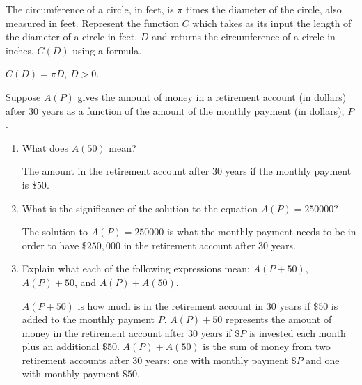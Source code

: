 \documentclass{ximera}
\begin{document}
\begin{problem}
The circumference of a circle, in feet,  is $\pi$ times the diameter of the circle, also measured in feet.  Represent the function $C$ which takes as its input the length of the diameter of a circle in feet, $D$ and returns the circumference of a circle in inches, $C(D)$ using a formula.

\begin{solution}
$C(D) = \pi D$,  $D > 0$.
\end{solution}
\end{problem}

\begin{problem}
Suppose $A(P)$ gives the amount of money in a retirement account (in dollars) after 30 years as a function of the amount of the monthly payment (in dollars), $P$.

\begin{enumerate}

\item What does $A(50)$ mean? 

\begin{solution}
The amount in the retirement account after 30 years if the monthly payment is $\$50$.
\end{solution}

\item  What is the significance of the solution to the equation $A(P) = 250000$? 

\begin{solution}
The solution to $A(P) = 250000$ is what the monthly payment needs to be in order to have $\$250,\!000$ in the retirement account after 30 years.
\end{solution}

\item  Explain what each of the following expressions mean:  $A(P+50)$, $A(P)+50$, and $A(P) + A(50)$.  

\begin{solution}
$A(P+50)$ is how much is in the retirement account in 30 years if $\$ 50$ is added to the monthly payment $P$.  $A(P)+50$ represents the amount of money in the retirement account after 30 years if $\$P$  is invested each month plus an additional $\$50$.  $A(P)+A(50)$ is the sum of money from two retirement accounts after 30 years: one with monthly payment $\$P$ and one with monthly payment $\$50$.

\end{solution}

\end{enumerate}
\end{problem}
 
\end{document}
